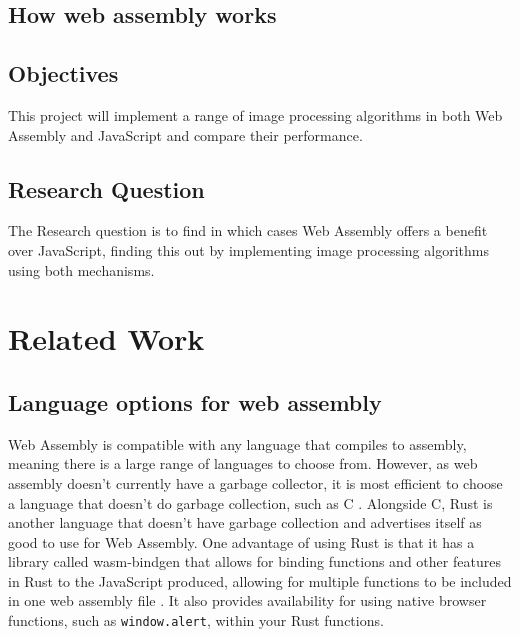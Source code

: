 \documentclass[12pt,a4paper]{article}
\begin{document}
\subsection{How web assembly works}





\subsection{Objectives}

This project will implement a range of image processing algorithms in both Web Assembly and JavaScript and compare their performance.


\subsection{Research Question}

The Research question is to find in which cases Web Assembly offers a benefit over JavaScript, finding this out by implementing image processing algorithms using both mechanisms.



\newpage


\section{Related Work}

\subsection{Language options for web assembly}

Web Assembly is compatible with any language that compiles to assembly, meaning there is a large range of languages to choose from. However, as web assembly doesn't currently have a garbage collector, it is most efficient to choose a language that doesn't do garbage collection, such as C \cite{haas2017bringing}. Alongside C, Rust is another language that doesn't have garbage collection and advertises itself as good to use for Web Assembly. One advantage of using Rust is that it has a library called wasm-bindgen that allows for binding functions and other features in Rust to the JavaScript produced, allowing for multiple functions to be included in one web assembly file \cite{wasmbindgen}. It also provides availability for using native browser functions, such as \texttt{window.alert}, within your Rust functions.
\end{document}
